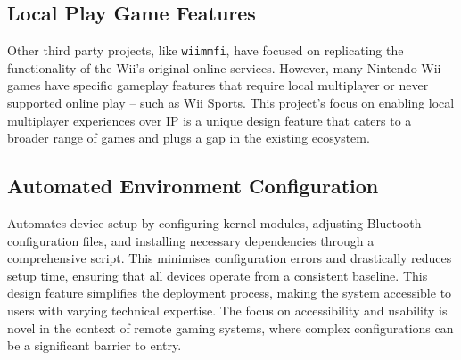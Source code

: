 \subsection{Local Play Game Features}
Other third party projects, like \texttt{wiimmfi}\cite{wiimmfi}, have focused on replicating the functionality of the Wii’s original online services. However, many Nintendo Wii games have specific gameplay features that require local multiplayer or never supported online play -- such as Wii Sports. This project’s focus on enabling local multiplayer experiences over IP is a unique design feature that caters to a broader range of games and plugs a gap in the existing ecosystem.

\subsection{Automated Environment Configuration}
Automates device setup by configuring kernel modules, adjusting Bluetooth configuration files, and installing necessary dependencies through a comprehensive script. This minimises configuration errors and drastically reduces setup time, ensuring that all devices operate from a consistent baseline. This design feature simplifies the deployment process, making the system accessible to users with varying technical expertise. The focus on accessibility and usability is novel in the context of remote gaming systems, where complex configurations can be a significant barrier to entry\cite{dirkBarrierToEntry}.





